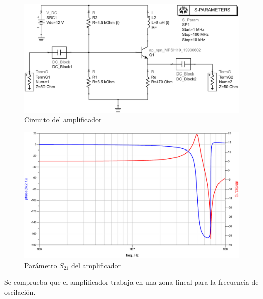\documentclass[journal]{IEEEtran}
\begin{document}
\begin{figure}[H]
\centering
\includegraphics[width=1\linewidth]{capturas/hartley_ampli_sch-cropped.pdf}
\caption{Circuito del amplificador}
\label{fig:hartley_amp_sch}
\end{figure}

\begin{figure}[H]
\centering
\includegraphics[width=1\linewidth]{capturas/hartley_ampli_bode-cropped.pdf}
\caption{Parámetro $S_{21}$ del amplificador}
\label{fig:hartley_amp_s21}
\end{figure}

Se comprueba que el amplificador trabaja en una zona lineal para la frecuencia de oscilación.
\end{document}
